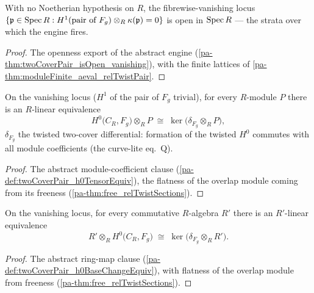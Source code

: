 \begin{theorem}
  \label{pa-thm:relTwistRigidEngine_isOpen}
  \leanok

  With no Noetherian hypothesis on \(R\), the fibrewise-vanishing locus
  \(\{\mathfrak p \in \operatorname{Spec} R : H^1(\text{pair of } F_g) \otimes_R
  \kappa(\mathfrak p) = 0\}\) is open in \(\operatorname{Spec} R\) --- the strata over which the
  engine fires.
\end{theorem}
\begin{proof}
  \leanok
  The openness export of the abstract engine
  (\ref{pa-thm:twoCoverPair_isOpen_vanishing}), with the finite lattices of
  \ref{pa-thm:moduleFinite_aeval_relTwistPair}.
\end{proof}

\begin{definition}
  \label{pa-def:relTwistH0TensorEquiv}
  \leanok

  On the vanishing locus (\(H^1\) of the pair of \(F_g\) trivial), for every
  \(R\)-module \(P\) there is an \(R\)-linear equivalence
  \[
    H^0\bigl(C_R, F_g\bigr) \otimes_R P \;\cong\;
      \ker\bigl(\delta_{F_g} \otimes_R P\bigr),
  \]
  \(\delta_{F_g}\) the twisted two-cover differential: formation of the twisted
  \(H^0\) commutes with all module coefficients (the curve-lite eq.\ Q).
\end{definition}
\begin{proof}
  \leanok
  The abstract module-coefficient clause (\ref{pa-def:twoCoverPair_h0TensorEquiv}), the
  flatness of the overlap module coming from its freeness
  (\ref{pa-thm:free_relTwistSections}).
\end{proof}

\begin{definition}
  \label{pa-def:relTwistH0BaseChangeEquiv}
  \leanok

  On the vanishing locus, for every commutative \(R\)-algebra \(R'\) there is an
  \(R'\)-linear equivalence
  \[
    R' \otimes_R H^0\bigl(C_R, F_g\bigr) \;\cong\;
      \ker\bigl(\delta_{F_g} \otimes_R R'\bigr).
  \]
\end{definition}
\begin{proof}
  \leanok
  The abstract ring-map clause (\ref{pa-def:twoCoverPair_h0BaseChangeEquiv}), with
  flatness of the overlap module from freeness (\ref{pa-thm:free_relTwistSections}).
\end{proof}

